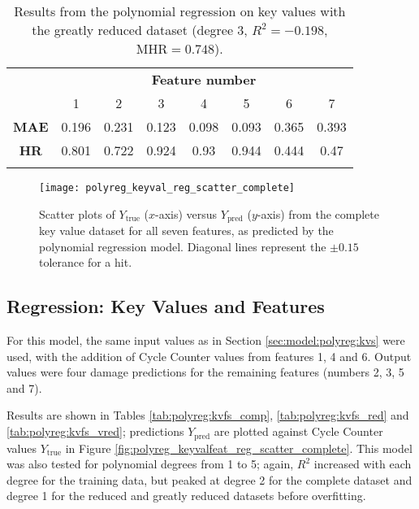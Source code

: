 \begin{table}
\begin{center}
        \caption{\label{tab:polyreg:kvs_vred} Results from the polynomial regression on key values with the greatly reduced dataset (degree 3, \(R^2 = -0.198\), \(\text{MHR} = 0.748\)).}
        \begin{tabular}{ >{\bfseries}c c c c c c c c }
            \multirow{2}{*}{\textbf{Measure}} & \multicolumn{7}{c}{\textbf{Feature number}} \\
             & 1 & 2 & 3 & 4 & 5 & 6 & 7 \\
            \midrule
            MAE & 0.196 & 0.231 & 0.123 & 0.098 & 0.093 & 0.365 & 0.393 \\
            HR  & 0.801 & 0.722 & 0.924 & 0.93 & 0.944 & 0.444 & 0.47 \\
            \\
        \end{tabular}
    \end{center}
\end{table}

\begin{figure}
    \centering
    \texttt{[image: polyreg\_keyval\_reg\_scatter\_complete]}
    \caption{\label{fig:polyreg_keyval_reg_scatter_complete} Scatter plots of \(Y_\text{true}\) (\(x\)-axis) versus \(Y_\text{pred}\) (\(y\)-axis) from the complete key value dataset for all seven features, as predicted by the polynomial regression model. Diagonal lines represent the \(\pm0.15\) tolerance for a hit.}
\end{figure}

\subsection{Regression: Key Values and Features} \label{sec:model:polyreg:kvfs}
For this model, the same input values as in Section \ref{sec:model:polyreg:kvs} were used, with the addition of Cycle Counter values from features 1, 4 and 6. Output values were four damage predictions for the remaining features (numbers 2, 3, 5 and 7).

Results are shown in Tables \ref{tab:polyreg:kvfs_comp}, \ref{tab:polyreg:kvfs_red} and \ref{tab:polyreg:kvfs_vred}; predictions \(Y_{\text{pred}}\) are plotted against Cycle Counter values \(Y_{\text{true}}\) in Figure \ref{fig:polyreg_keyvalfeat_reg_scatter_complete}. This model was also tested for polynomial degrees from 1 to 5; again, \(R^2\) increased with each degree for the training data, but peaked at degree 2 for the complete dataset and degree 1 for the reduced and greatly reduced datasets before overfitting.

